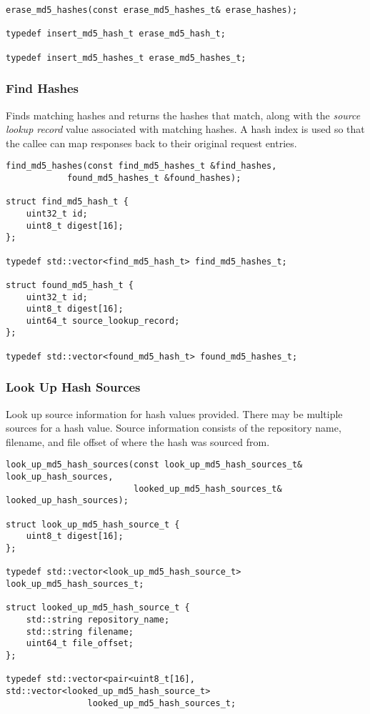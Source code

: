 \documentclass[12pt,twoside]{article}
\begin{document}
\begin{small}
\begin{verbatim}
erase_md5_hashes(const erase_md5_hashes_t& erase_hashes);

typedef insert_md5_hash_t erase_md5_hash_t;

typedef insert_md5_hashes_t erase_md5_hashes_t;
\end{verbatim}
\end{small}

\subsubsection{Find Hashes}
Finds matching hashes and returns the hashes that match,
along with the \emph{source lookup record} value
associated with matching hashes.
A hash index is used so that the callee can map responses back
to their original request entries.

\begin{small}
\begin{verbatim}
find_md5_hashes(const find_md5_hashes_t &find_hashes,
            found_md5_hashes_t &found_hashes);

struct find_md5_hash_t {
    uint32_t id;
    uint8_t digest[16];
};

typedef std::vector<find_md5_hash_t> find_md5_hashes_t;

struct found_md5_hash_t {
    uint32_t id;
    uint8_t digest[16];
    uint64_t source_lookup_record;
};

typedef std::vector<found_md5_hash_t> found_md5_hashes_t;
\end{verbatim}
\end{small}

\subsubsection{Look Up Hash Sources}
Look up source information for hash values provided.
There may be multiple sources for a hash value.
Source information consists of the repository name, filename, and file offset
of where the hash was sourced from.

\begin{small}
\begin{verbatim}
look_up_md5_hash_sources(const look_up_md5_hash_sources_t& look_up_hash_sources,
                         looked_up_md5_hash_sources_t& looked_up_hash_sources);

struct look_up_md5_hash_source_t {
    uint8_t digest[16];
};

typedef std::vector<look_up_md5_hash_source_t> look_up_md5_hash_sources_t;

struct looked_up_md5_hash_source_t {
    std::string repository_name;
    std::string filename;
    uint64_t file_offset;
};

typedef std::vector<pair<uint8_t[16], std::vector<looked_up_md5_hash_source_t>
                looked_up_md5_hash_sources_t;
\end{verbatim}
\end{small}
\end{document}
